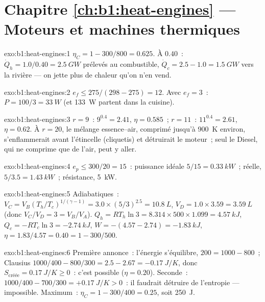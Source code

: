 \section*{Chapitre \ref{ch:b1:heat-engines} --- Moteurs et machines thermiques}

\begin{solution}{exo:b1:heat-engines:1}
$\eta_C = 1 - 300/800 = 0.625$. À $0.40$~: $\dot Q_h = 1.0/0.40 = \qty{2.5}{GW}$
prélevés au combustible, $\dot Q_c = 2.5 - 1.0 = \qty{1.5}{GW}$ vers la rivière ---
on jette plus de chaleur qu'on n'en vend.
\end{solution}

\begin{solution}{exo:b1:heat-engines:2}
$e_f \leq 275/(298 - 275) = 12$. Avec $e_f = 3$~: $P = 100/3 = \qty{33}{W}$
(et \qty{133}{W} partent dans la cuisine).
\end{solution}

\begin{solution}{exo:b1:heat-engines:3}
$r = 9$~: $9^{0.4} = 2.41$, $\eta = 0.585$~; $r = 11$~: $11^{0.4} = 2.61$,
$\eta = 0.62$. À $r = 20$, le mélange essence--air, comprimé jusqu'à
\qty{900}{K} environ, s'enflammerait avant l'étincelle (cliquetis) et
détruirait le moteur~; seul le Diesel, qui ne comprime que de l'air, peut y aller.
\end{solution}

\begin{solution}{exo:b1:heat-engines:4}
$e_p \leq 300/20 = 15$~: puissance idéale $5/15 = \qty{0.33}{kW}$~; réelle, $5/3.5 =
\qty{1.43}{kW}$~; résistance, \qty{5}{kW}.
\end{solution}

\begin{solution}{exo:b1:heat-engines:5}
Adiabatiques~: $V_C = V_B(T_h/T_c)^{1/(\gamma-1)} = 3.0 \times (5/3)^{2.5} =
\qty{10.8}{L}$, $V_D = 1.0 \times 3.59 = \qty{3.59}{L}$ (donc $V_C/V_D = 3 =
V_B/V_A$). $Q_h = RT_h\ln3 = 8.314 \times 500 \times 1.099 = \qty{4.57}{kJ}$,
$Q_c = -RT_c\ln3 = \qty{-2.74}{kJ}$, $W = -(4.57 - 2.74) = \qty{-1.83}{kJ}$,
$\eta = 1.83/4.57 = 0.40 = 1 - 300/500$.
\end{solution}

\begin{solution}{exo:b1:heat-engines:6}
Première annonce~: l'énergie s'équilibre, $200 = 1000 - 800$~; Clausius $1000/400 - 800/300
= 2.5 - 2.67 = \qty{-0.17}{J/K}$, donc $S_{\text{créée}} = \qty{0.17}{J/K} \geq 0$~:
c'est possible ($\eta = 0.20$). Seconde~: $1000/400 - 700/300 = +\qty{0.17}{J/K} > 0$~:
il faudrait détruire de l'entropie --- impossible. Maximum~: $\eta_C = 1 -
300/400 = 0.25$, soit \qty{250}{J}.
\end{solution}

